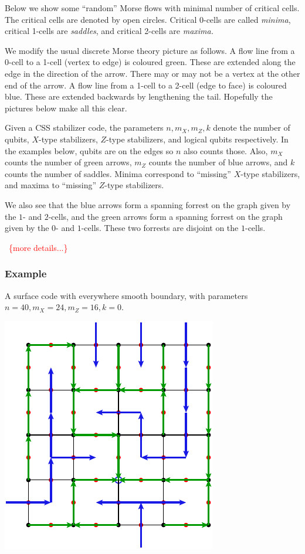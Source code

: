 \documentclass[11pt,oneside]{article}
\newcommand{\todo}[1]{\ \textcolor{red}{\{#1\}}\ }
\begin{document}
Below we show some ``random'' Morse flows with minimal number of 
critical cells.
The critical cells are denoted by open circles.
Critical 0-cells are called {\it minima}, critical
1-cells are {\it saddles}, and critical 2-cells are {\it maxima.}

We modify the usual discrete Morse theory picture as follows.
A flow line from a 0-cell to a 1-cell (vertex to edge)
is coloured green. These are extended along the edge in the
direction of the arrow. There may or may not be a vertex at the other
end of the arrow.
A flow line from a 1-cell to a 2-cell (edge to face)
is coloured blue. These are extended backwards by lengthening
the tail.
Hopefully the pictures below make all this clear.

Given a CSS stabilizer code,
the parameters $n,m_X,m_Z,k$ denote the number
of qubits, $X$-type stabilizers, $Z$-type stabilizers, and
logical qubits respectively.
In the examples below, qubits are on the edges 
so $n$ also counts those. 
Also, $m_X$ counts the number of green 
arrows, $m_Z$ counts the number of blue arrows,
and $k$ counts the number of saddles.
Minima correspond to ``missing'' $X$-type stabilizers,
and maxima to ``missing'' $Z$-type stabilizers.

We also see that the blue arrows form a spanning forrest
on the graph given by the $1$- and $2$-cells,
and the green arrows form a spanning
forrest on the graph given by the $0$- and $1$-cells.
These two forrests are disjoint on the $1$-cells.

\todo{more details...}

\subsubsection{Example}

A surface code with everywhere smooth boundary,
with parameters $n=40, m_X=24, m_Z=16, k=0.$

\begin{center}
\includegraphics[]{pic-disc.pdf}
\end{center}
\end{document}
